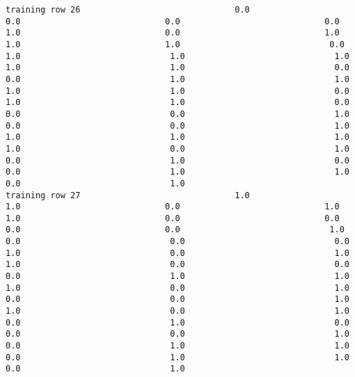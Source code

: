 \documentclass[11pt]{article}
\begin{document}
\begin{verbatim}
training row 26                               0.0                             0.0                             0.0                             0.0                             1.0                             0.0                             1.0                             1.0                             1.0                              0.0                              1.0                              1.0                              1.0                              1.0                              1.0                              0.0                              0.0                              1.0                              1.0                              1.0                              1.0                              0.0                              1.0                              1.0                              0.0                              0.0                              0.0                              1.0                              0.0                              0.0                              1.0                              1.0                              1.0                              1.0                              1.0                              0.0                              1.0                              0.0                              1.0                              0.0                              0.0                              1.0                              1.0                              0.0                              1.0
training row 27                               1.0                             1.0                             0.0                             1.0                             1.0                             0.0                             0.0                             0.0                             0.0                              1.0                              0.0                              0.0                              0.0                              1.0                              0.0                              1.0                              1.0                              0.0                              0.0                              0.0                              1.0                              1.0                              1.0                              0.0                              1.0                              0.0                              0.0                              1.0                              1.0                              0.0                              1.0                              0.0                              1.0                              0.0                              0.0                              0.0                              1.0                              0.0                              1.0                              1.0                              0.0                              1.0                              1.0                              0.0                              1.0

\end{verbatim}
\end{document}
